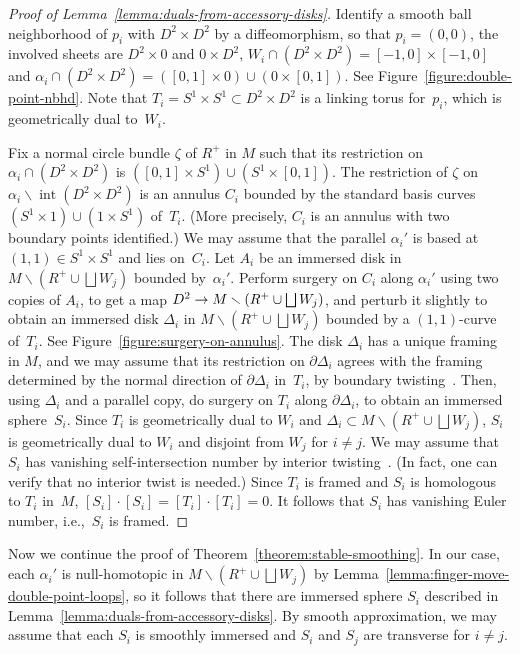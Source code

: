 \documentclass[11pt]{amsart}
\def\to{\mathchoice{\longrightarrow}{\rightarrow}{\rightarrow}{\rightarrow}}
\theoremstyle{definition}
\theoremstyle{theorem-giventitle}
\theoremstyle{definition-giventitle}
\numberwithin{equation}{section}
\def\inte{\operatorname{int}}
\def\setminus{\smallsetminus}
\begin{document}
\begin{proof}[Proof of Lemma~\ref{lemma:duals-from-accessory-disks}]
  Identify a smooth ball neighborhood of $p_i$ with $D^2\times D^2$ by a diffeomorphism, so that $p_i=(0,0)$, the involved sheets are $D^2\times 0$ and $0\times D^2$, $W_i\cap (D^2\times D^2) = [-1,0] \times [-1,0]$ and $\alpha_i\cap (D^2\times D^2)=([0,1]\times 0) \cup  (0\times [0,1])$.
  See Figure~\ref{figure:double-point-nbhd}.
  Note that $T_i=S^1\times S^1 \subset D^2\times D^2$ is a linking torus for~$p_i$, which is geometrically dual to~$W_i$.

  Fix a normal circle bundle $\zeta$ of $R^+$ in $M$ such that its restriction on $\alpha_i \cap (D^2\times D^2)$ is $([0,1]\times S^1) \cup (S^1\times[0,1])$.
  The restriction of $\zeta$ on $\alpha_i \setminus \inte(D^2\times D^2)$ is an annulus $C_i$ bounded by the standard basis curves $(S^1\times 1) \cup (1\times S^1)$ of~$T_i$.
  (More precisely, $C_i$ is an annulus with two boundary points identified.)
  We may assume that the parallel $\alpha_i'$ is based at $(1,1)\in S^1\times S^1$ and lies on~$C_i$.
  Let $A_i$ be an immersed disk in $M\setminus (R^+ \cup \bigsqcup W_j)$ bounded by~$\alpha_i'$.
  Perform surgery on $C_i$ along $\alpha_i'$ using two copies of $A_i$, to get a map $D^2 \to M\setminus (R^+ \cup \bigsqcup W_j)$, and perturb it slightly to obtain an immersed disk $\Delta_i$ in $M\setminus (R^+ \cup \bigsqcup W_j)$ bounded by a $(1,1)$-curve of~$T_i$.
  See Figure~\ref{figure:surgery-on-annulus}.
  The disk $\Delta_i$ has a unique framing in $M$, and we may assume that its restriction on $\partial \Delta_i$ agrees with the framing determined by the normal direction of $\partial \Delta_i$ in~$T_i$, by boundary twisting~\cite[1.3]{Freedman-Quinn:1990-1}.
  Then, using $\Delta_i$ and a parallel copy, do surgery on $T_i$ along $\partial \Delta_i$, to obtain an immersed sphere~$S_i$.
  Since $T_i$ is geometrically dual to $W_i$ and $\Delta_i \subset M\setminus (R^+ \cup \bigsqcup W_j)$, $S_i$ is geometrically dual to $W_i$ and disjoint from $W_j$ for $i \ne j$.
  We may assume that $S_i$ has vanishing self-intersection number by interior twisting~\cite[1.3]{Freedman-Quinn:1990-1}.
  (In fact, one can verify that no interior twist is needed.)
  Since $T_i$ is framed and $S_i$ is homologous to $T_i$ in~$M$, $[S_i]\cdot[S_i] = [T_i]\cdot[T_i]=0$.
  It follows that $S_i$ has vanishing Euler number, i.e.,\ $S_i$ is framed.
\end{proof}

Now we continue the proof of Theorem~\ref{theorem:stable-smoothing}\@.
In our case, each $\alpha_i'$ is null-homotopic in $M\setminus (R^+\cup\bigsqcup W_j)$ by Lemma~\ref{lemma:finger-move-double-point-loops}, so it follows that there are immersed sphere $S_i$ described in Lemma~\ref{lemma:duals-from-accessory-disks}.
By smooth approximation, we may assume that each $S_i$ is smoothly immersed and $S_i$ and $S_j$ are transverse for $i\ne j$.
\end{document}
